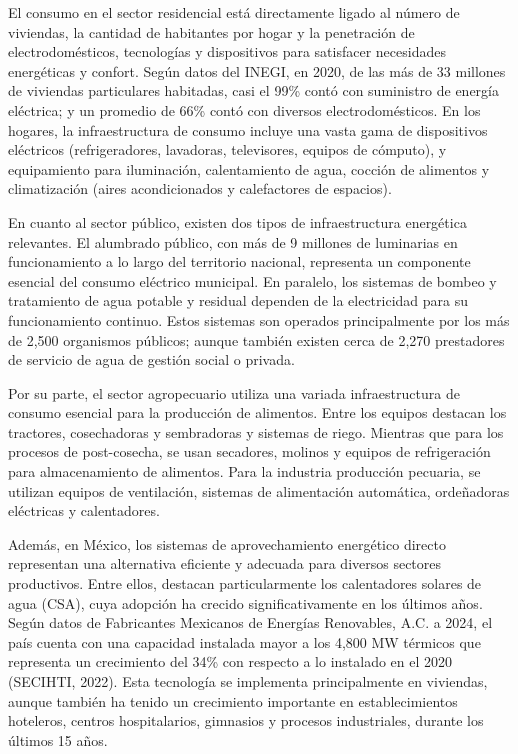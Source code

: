 \documentclass{sener2025}
\begin{document}
El consumo en el sector residencial está directamente ligado al número de viviendas, la cantidad de habitantes por hogar y la penetración de electrodomésticos, tecnologías y dispositivos para satisfacer necesidades energéticas y confort. Según datos del INEGI, en 2020, de las más de 33 millones de viviendas particulares habitadas, casi el 99\% contó con suministro de energía eléctrica; y un promedio de 66\% contó con diversos electrodomésticos. En los hogares, la infraestructura de consumo incluye una vasta gama de dispositivos eléctricos (refrigeradores, lavadoras, televisores, equipos de cómputo), y equipamiento para iluminación, calentamiento de agua, cocción de alimentos y climatización (aires acondicionados y calefactores de espacios).

En cuanto al sector público, existen dos tipos de infraestructura energética relevantes. El alumbrado público, con más de 9 millones de luminarias en funcionamiento a lo largo del territorio nacional, representa un componente esencial del consumo eléctrico municipal. En paralelo, los sistemas de bombeo y tratamiento de agua potable y residual dependen de la electricidad para su funcionamiento continuo. Estos sistemas son operados principalmente por los más de 2,500 organismos públicos; aunque también existen cerca de 2,270 prestadores de servicio de agua de gestión social o privada.

Por su parte, el sector agropecuario utiliza una variada infraestructura de consumo esencial para la producción de alimentos. Entre los equipos destacan los tractores, cosechadoras y sembradoras y sistemas de riego. Mientras que para los procesos de post-cosecha, se usan secadores, molinos y equipos de refrigeración para almacenamiento de alimentos. Para la industria producción pecuaria, se utilizan equipos de ventilación, sistemas de alimentación automática, ordeñadoras eléctricas y calentadores.

Además, en México, los sistemas de aprovechamiento energético directo representan una alternativa eficiente y adecuada para diversos sectores productivos. Entre ellos, destacan particularmente los calentadores solares de agua (CSA), cuya adopción ha crecido significativamente en los últimos años. Según datos de Fabricantes Mexicanos de Energías Renovables, A.C. a 2024, el país cuenta con una capacidad instalada mayor a los 4,800 MW térmicos que representa un crecimiento del 34\% con respecto a lo instalado en el 2020 (SECIHTI, 2022). Esta tecnología se implementa principalmente en viviendas, aunque también ha tenido un crecimiento importante en establecimientos hoteleros, centros hospitalarios, gimnasios y procesos industriales, durante los últimos 15 años.
\end{document}
